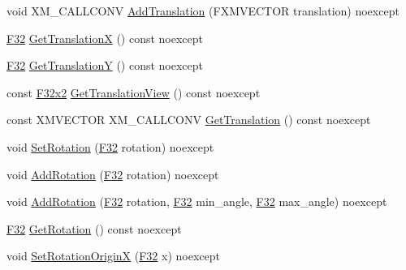 \begin{DoxyCompactItemize}
\item 
void X\+M\+\_\+\+C\+A\+L\+L\+C\+O\+NV \mbox{\hyperlink{classmage_1_1_texture_transform2_d_a724a5aa89ddcaf2705e0940101724e93}{Add\+Translation}} (F\+X\+M\+V\+E\+C\+T\+OR translation) noexcept
\item 
\mbox{\hyperlink{namespacemage_aa97e833b45f06d60a0a9c4fc22ae02c0}{F32}} \mbox{\hyperlink{classmage_1_1_texture_transform2_d_a66ff936a85a8ae326ab5c02b4db76cdf}{Get\+TranslationX}} () const noexcept
\item 
\mbox{\hyperlink{namespacemage_aa97e833b45f06d60a0a9c4fc22ae02c0}{F32}} \mbox{\hyperlink{classmage_1_1_texture_transform2_d_a89c758d9fa036da9686b474b060f8028}{Get\+TranslationY}} () const noexcept
\item 
const \mbox{\hyperlink{namespacemage_aee4759dedc8def6c6dec26b5c7eddf29}{F32x2}} \mbox{\hyperlink{classmage_1_1_texture_transform2_d_a305ff24ae415f870228f9b7cd492db78}{Get\+Translation\+View}} () const noexcept
\item 
const X\+M\+V\+E\+C\+T\+OR X\+M\+\_\+\+C\+A\+L\+L\+C\+O\+NV \mbox{\hyperlink{classmage_1_1_texture_transform2_d_ac90d3f3d0c91c7126266c944883107cb}{Get\+Translation}} () const noexcept
\item 
void \mbox{\hyperlink{classmage_1_1_texture_transform2_d_a136959b904e358f0008321a0f86a55a8}{Set\+Rotation}} (\mbox{\hyperlink{namespacemage_aa97e833b45f06d60a0a9c4fc22ae02c0}{F32}} rotation) noexcept
\item 
void \mbox{\hyperlink{classmage_1_1_texture_transform2_d_a12cacfb40c70b6dd3872d2b27298845c}{Add\+Rotation}} (\mbox{\hyperlink{namespacemage_aa97e833b45f06d60a0a9c4fc22ae02c0}{F32}} rotation) noexcept
\item 
void \mbox{\hyperlink{classmage_1_1_texture_transform2_d_a05c55877cd323ae22d9be03103cb6ec4}{Add\+Rotation}} (\mbox{\hyperlink{namespacemage_aa97e833b45f06d60a0a9c4fc22ae02c0}{F32}} rotation, \mbox{\hyperlink{namespacemage_aa97e833b45f06d60a0a9c4fc22ae02c0}{F32}} min\+\_\+angle, \mbox{\hyperlink{namespacemage_aa97e833b45f06d60a0a9c4fc22ae02c0}{F32}} max\+\_\+angle) noexcept
\item 
\mbox{\hyperlink{namespacemage_aa97e833b45f06d60a0a9c4fc22ae02c0}{F32}} \mbox{\hyperlink{classmage_1_1_texture_transform2_d_a29e076372fa33d75d074aa738d39d359}{Get\+Rotation}} () const noexcept
\item 
void \mbox{\hyperlink{classmage_1_1_texture_transform2_d_af7b3e07d6704e42dfa430333f107eb27}{Set\+Rotation\+OriginX}} (\mbox{\hyperlink{namespacemage_aa97e833b45f06d60a0a9c4fc22ae02c0}{F32}} x) noexcept

\end{DoxyCompactItemize}
